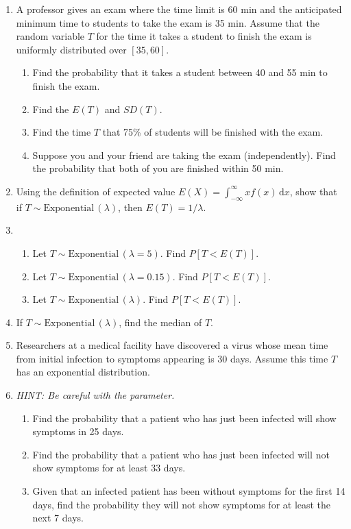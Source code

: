 \documentclass{article}
\newcommand{\follow}[1]{\sim \text{#1}\,}		%
\newcommand{\integral}[4]{\displaystyle \int_{#1}^{#2} #3 \,\mathrm{d} #4}		%
\begin{document}
\begin{enumerate}
    \item A professor gives an exam where the time limit is 60 min and the anticipated minimum time to students to take the exam is 35 min. Assume that the random variable $T$ for the time it takes a student to finish the exam is uniformly distributed over $[35,60]$.%
    \begin{enumerate}
        \item Find the probability that it takes a student between 40 and 55 min to finish the exam.%
        \item Find the $E(T)$ and $SD(T)$.
        \item Find the time $T$ that 75\% of students will be finished with the exam.
        \item Suppose you and your friend are taking the exam (independently). Find the probability that both of you are finished within 50 min.%
    \end{enumerate}\bigskip
    
    \item Using the definition of expected value $E(X) = \integral{-\infty}{\infty}{x f(x)}{x}$, show that if $T \follow{Exponential}(\lambda)$, then $E(T) = 1 / \lambda$.\bigskip%
    
    \item 
    \begin{enumerate}
        \item Let $T \follow{Exponential}(\lambda = 5)$. Find $P[T < E(T)]$.
        \item Let $T \follow{Exponential}(\lambda = 0.15)$. Find $P[T < E(T)]$.
        \item Let $T \follow{Exponential}(\lambda)$. Find $P[T < E(T)]$.
    \end{enumerate}\bigskip
    
    \item If $T \follow{Exponential}(\lambda)$, find the median of $T$.\bigskip%
    \item Researchers at a medical facility have discovered a virus whose mean time from initial infection to symptoms appearing is 30 days. Assume this time $T$ has an exponential distribution.%
    \item[] \textit{HINT: Be careful with the parameter.}
    \begin{enumerate}
        \item Find the probability that a patient who has just been infected will show symptoms in 25 days.
        \item Find the probability that a patient who has just been infected will not show symptoms for at least 33 days.
        \item Given that an infected patient has been without symptoms for the first 14 days, find the probability they will not show symptoms for at least the next 7 days.%
    \end{enumerate}\bigskip
    

\end{enumerate}
\end{document}
